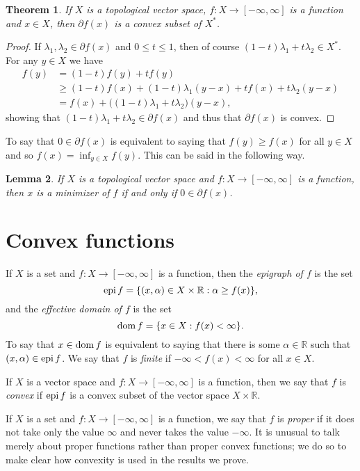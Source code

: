 \documentclass{article}
\newcommand{\epi}{\ensuremath\mathrm{epi}\,}
\newcommand{\dom}{\ensuremath\mathrm{dom}\,}
\newtheorem{theorem}{Theorem}
\newtheorem{lemma}[theorem]{Lemma}
\theoremstyle{definition}
\begin{document}
\begin{theorem}
If $X$ is a topological vector space, $f:X \to [-\infty,\infty]$ is a function and $x \in X$, then $\partial f(x)$ is a convex subset of $X^*$.
\label{convexsub}
\end{theorem}
\begin{proof}
If $\lambda_1,\lambda_2 \in \partial f(x)$ and $0 \leq t \leq 1$, then of course $(1-t)\lambda_1+t\lambda_2 \in X^*$. For any $y \in X$ we have
\begin{align*}
f(y) &= (1-t)f(y)+tf(y)\\
& \geq (1-t)f(x)+(1-t)\lambda_1(y-x)+tf(x)+t\lambda_2 (y-x)\\
&=f(x)+\big((1-t)\lambda_1+t\lambda_2\big) (y-x),
\end{align*}
showing that $(1-t)\lambda_1+t\lambda_2 \in \partial f(x)$ and thus that $\partial f(x)$ is convex.
\end{proof}


To say that $0 \in \partial f(x)$ is equivalent to saying that $f(y) \geq f(x)$ for all $y \in X$ and so $f(x)=\inf_{y \in X} f(y)$. This can be said in the following way.

\begin{lemma}
If $X$ is a topological vector space and $f:X \to [-\infty,\infty]$ is a  function, then $x$ is a minimizer of $f$ if and only if $0 \in \partial f(x)$.
\end{lemma}

\section{Convex functions}
If $X$ is a set and $f:X \to [-\infty,\infty]$ is a function, then the {\em epigraph of $f$} is the set
\[
 \epi f=\{(x,\alpha) \in X \times \mathbb{R} : \alpha \geq f(x)\},
\]
and the {\em effective domain of $f$} is the set
\[
\dom f = \{ x \in X: f(x)<\infty\}.
\]
To say that $x \in \dom f$ is equivalent to saying that there is some $\alpha \in \mathbb{R}$ such that $(x,\alpha) \in \epi f$.
We say that $f$ is {\em finite} if $-\infty<f(x)<\infty$ for all $x \in X$.

If $X$ is a vector space and $f:X \to [-\infty,\infty]$ is a function, then we say that $f$ is {\em convex} if 
$\epi f$ is a convex subset of the vector space $X \times \mathbb{R}$. 

If $X$ is a set and $f:X \to [-\infty,\infty]$ is a function, we say that $f$ is
{\em proper} if it does not  take only
the value $\infty$ and never takes the value $-\infty$.  It is unusual to talk merely
about proper functions rather than proper convex functions; we do so to make clear how convexity is used in the results we prove.
\end{document}

